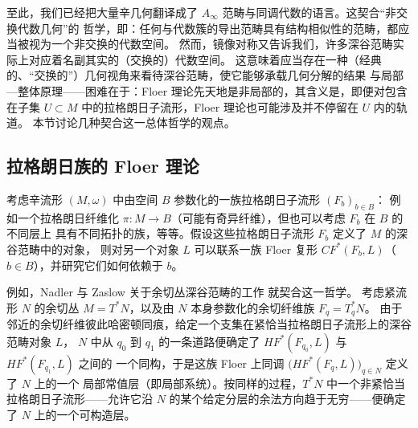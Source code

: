 \documentclass[UTF8,a4paper,11pt,fontset=windows]{ctexart}
\theoremstyle{cnthm}
\numberwithin{equation}{section}
\newcommand{\CF}{CF}                  %
\newcommand{\HF}{HF}                  %
\begin{document}
至此，我们已经把大量辛几何翻译成了 $A_\infty$ 范畴与同调代数的语言。这契合“非交换代数几何”的
哲学，即：任何与代数簇的导出范畴具有结构相似性的范畴，都应当被视为一个非交换的代数空间。
然而，镜像对称又告诉我们，许多深谷范畴实际上对应着名副其实的（交换的）代数空间。
这意味着应当存在一种（经典的、“交换的”）几何视角来看待深谷范畴，使它能够承载几何分解的结果
与局部—整体原理——困难在于：Floer 理论先天地是非局部的，其含义是，即便对包含在子集
$U\subset M$ 中的拉格朗日子流形，Floer 理论也可能涉及并不停留在 $U$ 内的轨道。
本节讨论几种契合这一总体哲学的观点。


\subsection{拉格朗日族的 Floer 理论}\label{sec:3.1}

考虑辛流形 $(M,\omega)$ 中由空间 $B$ 参数化的一族拉格朗日子流形 $(F_b)_{b\in B}$：
例如一个拉格朗日纤维化 $\pi:M\to B$（可能有奇异纤维），但也可以考虑 $F_b$ 在 $B$ 的不同层上
具有不同拓扑的族，等等。假设这些拉格朗日子流形 $F_b$ 定义了 $M$ 的深谷范畴中的对象，
则对另一个对象 $L$ 可以联系一族 Floer 复形 $\CF^{*}(F_b,L)$（$b\in B$），并研究它们如何依赖于 $b$。

例如，Nadler 与 Zaslow 关于余切丛深谷范畴的工作 \cite{r75,r78} 就契合这一哲学。
考虑紧流形 $N$ 的余切丛 $M=T^{*}N$，以及由 $N$ 本身参数化的余切纤维族 $F_q=T^{*}_qN$。
由于邻近的余切纤维彼此哈密顿同痕，给定一个支集在紧恰当拉格朗日子流形上的深谷范畴对象 $L$，
$N$ 中从 $q_0$ 到 $q_1$ 的一条道路便确定了 $\HF^{*}(F_{q_0},L)$ 与 $\HF^{*}(F_{q_1},L)$ 之间的
一个同构，于是这族 Floer 上同调 $\bigl(\HF^{*}(F_q,L)\bigr)_{q\in N}$ 定义了 $N$ 上的一个
局部常值层（即局部系统）。按同样的过程，$T^{*}N$ 中一个非紧恰当拉格朗日子流形——允许它沿
$N$ 的某个给定分层的余法方向趋于无穷——便确定了 $N$ 上的一个可构造层。

\end{document}
